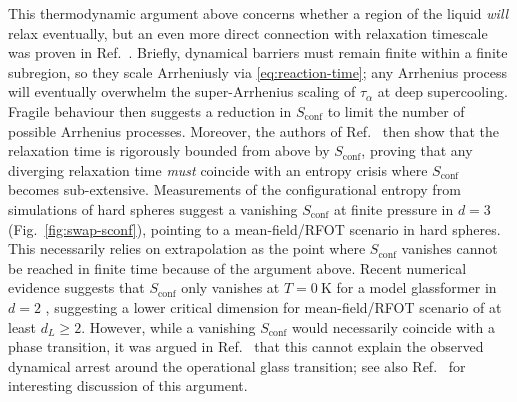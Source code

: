 \documentclass[11pt,twoside]{report}
\begin{document}
This thermodynamic argument above concerns whether a region of the liquid \emph{will} relax eventually, but an even more direct connection with relaxation timescale was proven in Ref.\ \cite{MontanariJSP2006}.
Briefly, dynamical barriers must remain finite within a finite subregion, so they scale Arrheniusly via \eqref{eq:reaction-time}; any Arrhenius process will eventually overwhelm the super-Arrhenius scaling of $\tau_\alpha$ at deep supercooling.
Fragile behaviour then suggests a reduction in $S_\mathrm{conf}$ to limit the number of possible Arrhenius processes.
Moreover, the authors of Ref.\ \cite{MontanariJSP2006} then show that the relaxation time is rigorously bounded from above by $S_\mathrm{conf}$, proving that any diverging relaxation time \emph{must} coincide with an entropy crisis where $S_\mathrm{conf}$ becomes sub-extensive.
Measurements of the configurational entropy from simulations of hard spheres suggest a vanishing $S_\mathrm{conf}$ at finite pressure in $d=3$ (Fig.\ \ref{fig:swap-sconf}), pointing to a mean-field/RFOT scenario in hard spheres.
This necessarily relies on extrapolation as the point where $S_\mathrm{conf}$ vanishes cannot be reached in finite time because of the argument above.
Recent numerical evidence suggests that $S_\mathrm{conf}$ only vanishes at $T=\SI{0}{\kelvin}$ for a model glassformer in $d=2$ \cite{BerthierNC2019}, suggesting a lower critical dimension for mean-field/RFOT scenario of at least $d_L \ge 2$.
However, while a vanishing $S_\mathrm{conf}$ would necessarily coincide with a phase transition, it was argued in Ref.\ \cite{WyartPRL2017} that this cannot explain the observed dynamical arrest around the operational glass transition; see also Ref.\ \cite{BerthierJCP2019} for interesting discussion of this argument.


\end{document}
